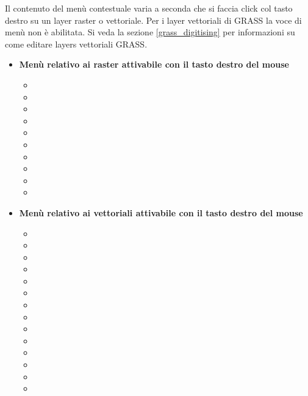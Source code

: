 Il contenuto del menù contestuale varia a seconda che si faccia click col tasto destro
su un layer raster o vettoriale. Per i layer vettoriali di GRASS la voce di menù 
non è abilitata. Si veda la sezione \ref{grass_digitising} per informazioni su come
editare layers vettoriali GRASS. 

\begin{itemize}

\item \textbf{Menù relativo ai raster attivabile con il tasto destro del mouse}
\begin{itemize}
\item {}
\item {}
\item {}
\item {}
\item {}
\item {}
\item {}
\item {}
\item {}
\item {}
\end{itemize}

\item \textbf{Menù relativo ai vettoriali attivabile con il tasto destro del mouse}
\begin{itemize}
\item {}
\item {}
\item {}
\item {}
\item {}
\item {}
\item {}
\item {}
\item {}
\item {}
\item {}
\item {}
\item {}
\item {}
\end{itemize}


\end{itemize}
